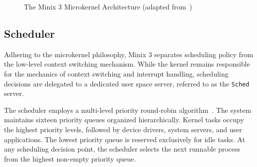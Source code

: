 \documentclass[a4paper,10pt,twoside]{report}
\theoremstyle{definition}
\begin{document}
\begin{figure}[htbp]
{
  }%
\caption{The Minix 3 Microkernel Architecture (adapted from~\cite{minix_wikipedia})}
\label{fig:minix_architecture}
\end{figure}

\subsection{Scheduler}
Adhering to the microkernel philosophy, Minix 3 separates scheduling policy from the low-level context switching mechanism. While the kernel remains responsible for the mechanics of context switching and interrupt handling, scheduling decisions are delegated to a dedicated user space server, referred to as the \texttt{Sched} server.

The scheduler employs a multi-level priority round-robin algorithm~\cite{minix_sched}. The system maintains sixteen priority queues organized hierarchically. Kernel tasks occupy the highest priority levels, followed by device drivers, system servers, and user applications. The lowest priority queue is reserved exclusively for idle tasks. At any scheduling decision point, the scheduler selects the next runnable process from the highest non-empty priority queue.
\end{document}
